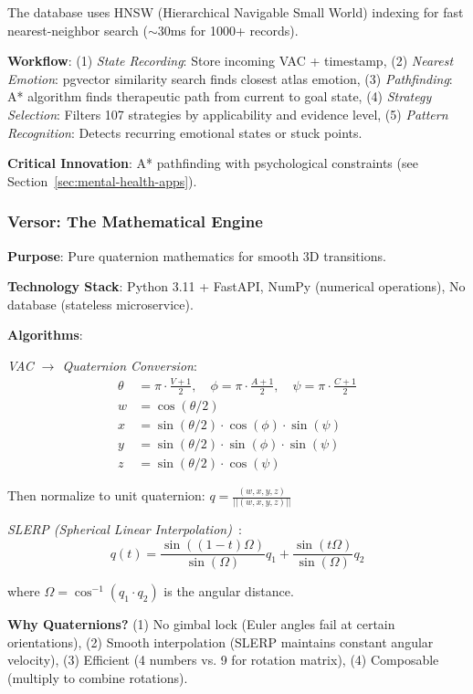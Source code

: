 \documentclass[10pt,twocolumn]{article}
\begin{document}
The database uses HNSW (Hierarchical Navigable Small World) indexing for fast nearest-neighbor search ($\sim$30ms for 1000+ records).

\textbf{Workflow}: (1) \textit{State Recording}: Store incoming VAC + timestamp, (2) \textit{Nearest Emotion}: pgvector similarity search finds closest atlas emotion, (3) \textit{Pathfinding}: A* algorithm finds therapeutic path from current to goal state, (4) \textit{Strategy Selection}: Filters 107 strategies by applicability and evidence level, (5) \textit{Pattern Recognition}: Detects recurring emotional states or stuck points.

\textbf{Critical Innovation}: A* pathfinding with psychological constraints (see Section~\ref{sec:mental-health-apps}).

\subsubsection{Versor: The Mathematical Engine}

\textbf{Purpose}: Pure quaternion mathematics for smooth 3D transitions.

\textbf{Technology Stack}: Python 3.11 + FastAPI, NumPy (numerical operations), No database (stateless microservice).

\textbf{Algorithms}:

\textit{VAC $\rightarrow$ Quaternion Conversion}:
\begin{align}
\theta &= \pi \cdot \frac{V + 1}{2}, \quad
\phi = \pi \cdot \frac{A + 1}{2}, \quad
\psi = \pi \cdot \frac{C + 1}{2} \\
w &= \cos(\theta/2) \\
x &= \sin(\theta/2) \cdot \cos(\phi) \cdot \sin(\psi) \\
y &= \sin(\theta/2) \cdot \sin(\phi) \cdot \sin(\psi) \\
z &= \sin(\theta/2) \cdot \cos(\psi)
\end{align}

Then normalize to unit quaternion: $q = \frac{(w, x, y, z)}{||(w, x, y, z)||}$

\textit{SLERP (Spherical Linear Interpolation)}~\cite{shoemake1985}:
$$q(t) = \frac{\sin((1-t)\Omega)}{\sin(\Omega)} q_1 + \frac{\sin(t\Omega)}{\sin(\Omega)} q_2$$

where $\Omega = \cos^{-1}(q_1 \cdot q_2)$ is the angular distance.

\textbf{Why Quaternions?} (1) No gimbal lock (Euler angles fail at certain orientations), (2) Smooth interpolation (SLERP maintains constant angular velocity), (3) Efficient (4 numbers vs. 9 for rotation matrix), (4) Composable (multiply to combine rotations).
\end{document}
